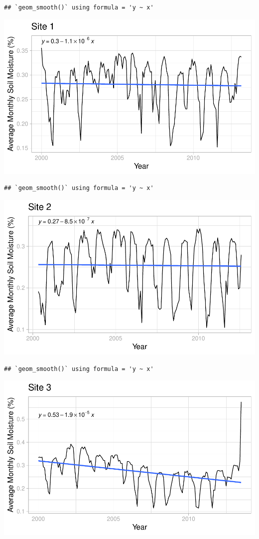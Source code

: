\documentclass[
  12pt,
]{article}
\begin{document}
\begin{verbatim}
## `geom_smooth()` using formula = 'y ~ x'
\end{verbatim}

\includegraphics{Project_Template_files/figure-latex/Average Monthly Soil Moisture Plots-1.pdf}

\begin{verbatim}
## `geom_smooth()` using formula = 'y ~ x'
\end{verbatim}

\includegraphics{Project_Template_files/figure-latex/Average Monthly Soil Moisture Plots-2.pdf}

\begin{verbatim}
## `geom_smooth()` using formula = 'y ~ x'
\end{verbatim}

\includegraphics{Project_Template_files/figure-latex/Average Monthly Soil Moisture Plots-3.pdf}
\end{document}
